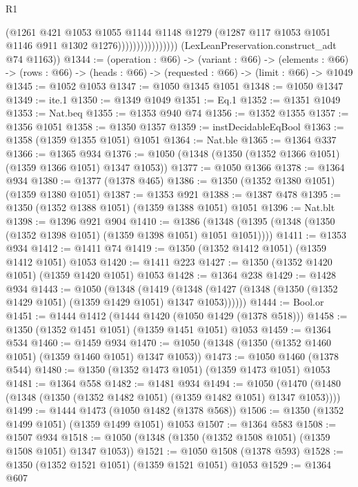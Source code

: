 \begin{lexlean}{R1}
\begin{coremodule}
                                  (@1261
                                    @421
                                    @1053
                                    @1055
                                    @1144
                                    @1148
                                    @1279
                                    (@1287 @117 @1053 @1051 @1146 @911 @1302 @1276))))))))))))))))
      (LexLeanPreservation.construct_adt @74 @1163))
@1344 := (operation : @66) ->
  (variant : @66) ->
  (elements : @66) -> (rows : @66) -> (heads : @66) -> (requested : @66) -> (limit : @66) -> @1049
@1345 := @1052 @1053
@1347 := @1050 @1345 @1051
@1348 := @1050 @1347
@1349 := ite.{1}
@1350 := @1349 @1049
@1351 := Eq.{1}
@1352 := @1351 @1049
@1353 := Nat.beq
@1355 := @1353 @940 @74
@1356 := @1352 @1355
@1357 := @1356 @1051
@1358 := @1350 @1357
@1359 := instDecidableEqBool
@1363 := @1358 (@1359 @1355 @1051) @1051
@1364 := Nat.ble
@1365 := @1364 @337
@1366 := @1365 @934
@1376 := @1050 (@1348 (@1350 (@1352 @1366 @1051) (@1359 @1366 @1051) @1347 @1053))
@1377 := @1050 @1366
@1378 := @1364 @934
@1380 := @1377 (@1378 @465)
@1386 := @1350 (@1352 @1380 @1051) (@1359 @1380 @1051)
@1387 := @1353 @921
@1388 := @1387 @478
@1395 := @1350 (@1352 @1388 @1051) (@1359 @1388 @1051) @1051
@1396 := Nat.blt
@1398 := @1396 @921 @904
@1410 := @1386 (@1348 (@1395 (@1348 (@1350 (@1352 @1398 @1051) (@1359 @1398 @1051) @1051 @1051))))
@1411 := @1353 @934
@1412 := @1411 @74
@1419 := @1350 (@1352 @1412 @1051) (@1359 @1412 @1051) @1053
@1420 := @1411 @223
@1427 := @1350 (@1352 @1420 @1051) (@1359 @1420 @1051) @1053
@1428 := @1364 @238
@1429 := @1428 @934
@1443 := @1050
    (@1348
      (@1419 (@1348 (@1427 (@1348 (@1350 (@1352 @1429 @1051) (@1359 @1429 @1051) @1347 @1053))))))
@1444 := Bool.or
@1451 := @1444 @1412 (@1444 @1420 (@1050 @1429 (@1378 @518)))
@1458 := @1350 (@1352 @1451 @1051) (@1359 @1451 @1051) @1053
@1459 := @1364 @534
@1460 := @1459 @934
@1470 := @1050 (@1348 (@1350 (@1352 @1460 @1051) (@1359 @1460 @1051) @1347 @1053))
@1473 := @1050 @1460 (@1378 @544)
@1480 := @1350 (@1352 @1473 @1051) (@1359 @1473 @1051) @1053
@1481 := @1364 @558
@1482 := @1481 @934
@1494 := @1050 (@1470 (@1480 (@1348 (@1350 (@1352 @1482 @1051) (@1359 @1482 @1051) @1347 @1053))))
@1499 := @1444 @1473 (@1050 @1482 (@1378 @568))
@1506 := @1350 (@1352 @1499 @1051) (@1359 @1499 @1051) @1053
@1507 := @1364 @583
@1508 := @1507 @934
@1518 := @1050 (@1348 (@1350 (@1352 @1508 @1051) (@1359 @1508 @1051) @1347 @1053))
@1521 := @1050 @1508 (@1378 @593)
@1528 := @1350 (@1352 @1521 @1051) (@1359 @1521 @1051) @1053
@1529 := @1364 @607

\end{coremodule}
\end{lexlean}
